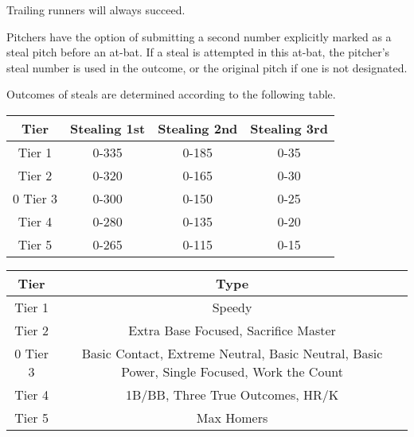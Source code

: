 \begin{deepEnumerate}
\begin{deepEnumerate}
\begin{deepEnumerate}
\begin{deepEnumerate}
				Trailing runners will always succeed.
			\end{deepEnumerate}
			\item Pitchers have the option of submitting a second number explicitly marked as a steal pitch before an at-bat. 
			If a steal is attempted in this at-bat, the pitcher’s steal number is used in the outcome, 
			or the original pitch if one is not designated.
		\end{deepEnumerate}
		\pagebreak %
		\item Outcomes of steals are determined according to the following table.
		\begin{center}
			\begin{tabular}{|c|c|c|c|}
				\hline
				\textbf{Tier} & \textbf{Stealing 1st}  & \textbf{Stealing 2nd}  & \textbf{Stealing 3rd}                                              \\
				\hline 
				Tier 1   	 & 0-335                          & 0-185                          & 0-35 \\
				\hline
				Tier 2    	 & 0-320                          & 0-165                          & 0-30 \\
				\hline0
				Tier 3   	 & 0-300                          & 0-150                          & 0-25 \\
				\hline
				Tier 4   	 & 0-280                          & 0-135                          & 0-20 \\
				\hline
				Tier 5   	 & 0-265                          & 0-115                          & 0-15 \\
				\hline
			\end{tabular}
			\begin{tabular}{|c|c|}
				\hline
				\textbf{Tier} & \textbf{Type}                                           		\\
				\hline 
				Tier 1   	 & Speedy \\
				\hline
				Tier 2    	 & Extra Base Focused, Sacrifice Master\\
				\hline0
				Tier 3   	 &Basic Contact, Extreme Neutral, Basic Neutral, Basic Power, Single Focused, Work the Count \\
				\hline
				Tier 4   	 & 1B/BB, Three True Outcomes, HR/K \\
				\hline
				Tier 5   	 & Max Homers \\
				\hline
			\end{tabular}
			

\end{center}
\end{deepEnumerate}
\end{deepEnumerate}
